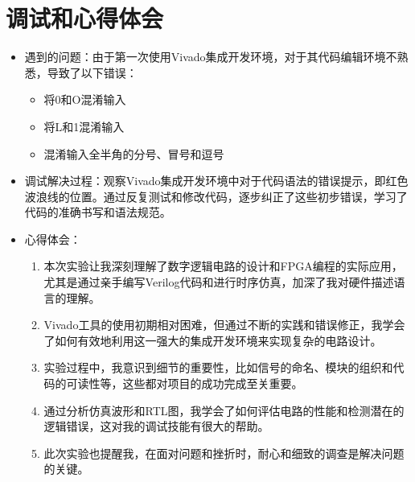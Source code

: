 \documentclass[a4,10pt,zihao=-4]{ctexart}
\begin{document}
\section{调试和心得体会}
\begin{itemize}
  \item 遇到的问题：由于第一次使用Vivado集成开发环境，对于其代码编辑环境不熟悉，导致了以下错误：
    \begin{itemize}
      \item 将0和O混淆输入
      \item 将L和1混淆输入
      \item 混淆输入全半角的分号、冒号和逗号
    \end{itemize}
  \item 调试解决过程：观察Vivado集成开发环境中对于代码语法的错误提示，即红色波浪线的位置。通过反复测试和修改代码，逐步纠正了这些初步错误，学习了代码的准确书写和语法规范。
  \item 心得体会：
    \begin{enumerate}
      \item 本次实验让我深刻理解了数字逻辑电路的设计和FPGA编程的实际应用，尤其是通过亲手编写Verilog代码和进行时序仿真，加深了我对硬件描述语言的理解。
      \item Vivado工具的使用初期相对困难，但通过不断的实践和错误修正，我学会了如何有效地利用这一强大的集成开发环境来实现复杂的电路设计。
      \item 实验过程中，我意识到细节的重要性，比如信号的命名、模块的组织和代码的可读性等，这些都对项目的成功完成至关重要。
      \item 通过分析仿真波形和RTL图，我学会了如何评估电路的性能和检测潜在的逻辑错误，这对我的调试技能有很大的帮助。
      \item 此次实验也提醒我，在面对问题和挫折时，耐心和细致的调查是解决问题的关键。
    \end{enumerate}
\end{itemize}
\end{document}
